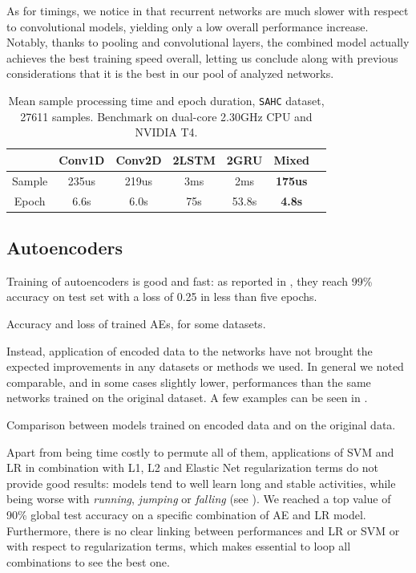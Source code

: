 As for timings, we notice in  that recurrent networks are much slower with respect to convolutional models, yielding only a low overall performance increase.
Notably, thanks to pooling and convolutional layers, the combined model actually achieves the best training speed overall, letting us conclude along with previous considerations that it is the best in our pool of analyzed networks.

\begin{table}[ht]
\centering
\caption{Mean sample processing time and epoch duration, \texttt{SAHC} dataset, 27611 samples. Benchmark on dual-core 2.30GHz CPU and NVIDIA\textregistered{} T4.}
\label{tab:timings}
\begin{tabular}{c|cccccc}\toprule
       & Conv1D & Conv2D  & 2LSTM & 2GRU  & Mixed \\\midrule
Sample & 235us  & 219us   & 3ms   & 2ms   & \textbf{175us} \\
Epoch  & 6.6s    & 6.0s   & 75s   & 53.8s & \textbf{4.8s}  \\\bottomrule
\end{tabular}
\end{table}

\subsection{Autoencoders}
Training of autoencoders is good and fast: as reported in , they reach 99\% accuracy on test set with a loss of 0.25 in less than five epochs.

\begin{table}[ht]
\centering
\caption{Accuracy and loss of trained AEs, for some datasets.}
\label{tab:ae_train}

\end{table}

Instead, application of encoded data to the networks have not brought the expected improvements in any datasets or methods we used.
In general we noted comparable, and in some cases slightly lower, performances than the same networks trained on the original dataset. A few examples can be seen in .

\begin{table}[ht]
\centering
\caption{Comparison between models trained on encoded data and on the original data.}
\label{tab:ae_comp}

\end{table}

Apart from being time costly to permute all of them, applications of SVM and LR in combination with L1, L2 and Elastic Net regularization terms do not provide good results: models tend to well learn long and stable activities, while being worse with \textit{running}, \textit{jumping} or \textit{falling} (see ).
We reached a top value of 90\% global test accuracy on a specific combination of AE and LR model.
Furthermore, there is no clear linking between performances and LR or SVM or with respect to regularization terms, which makes essential to loop all combinations to see the best one.

